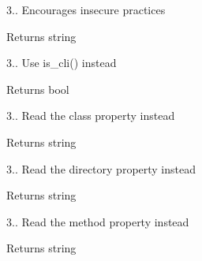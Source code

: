 
\begin{DoxyRefList}
\item[\label{deprecated__deprecated000001}%
\hypertarget{deprecated__deprecated000001}{}%
Global \hyperlink{class_c_i___config_a71e857f8dd38c230f1ce11bacf177ba8}{C\+I\+\_\+\+Config\+:\+:system\+\_\+url} ()]3.. Encourages insecure practices \begin{DoxyReturn}{Returns}
string  
\end{DoxyReturn}

\item[\label{deprecated__deprecated000002}%
\hypertarget{deprecated__deprecated000002}{}%
Global \hyperlink{class_c_i___input_a70c1e8a081ef955c1a52164634d4f66e}{C\+I\+\_\+\+Input\+:\+:is\+\_\+cli\+\_\+request} ()]3.. Use is\+\_\+cli() instead \begin{DoxyReturn}{Returns}
bool  
\end{DoxyReturn}

\item[\label{deprecated__deprecated000003}%
\hypertarget{deprecated__deprecated000003}{}%
Global \hyperlink{class_c_i___router_af5586c3f514021e9e2588e102620d237}{C\+I\+\_\+\+Router\+:\+:fetch\+\_\+class} ()]3.. Read the \textquotesingle{}class\textquotesingle{} property instead \begin{DoxyReturn}{Returns}
string  
\end{DoxyReturn}

\item[\label{deprecated__deprecated000005}%
\hypertarget{deprecated__deprecated000005}{}%
Global \hyperlink{class_c_i___router_a7a089f2cfae731dcc9e59a71d20208ef}{C\+I\+\_\+\+Router\+:\+:fetch\+\_\+directory} ()]3.. Read the \textquotesingle{}directory\textquotesingle{} property instead \begin{DoxyReturn}{Returns}
string  
\end{DoxyReturn}

\item[\label{deprecated__deprecated000004}%
\hypertarget{deprecated__deprecated000004}{}%
Global \hyperlink{class_c_i___router_ad408b28e3a095e7435f21e95d93e7714}{C\+I\+\_\+\+Router\+:\+:fetch\+\_\+method} ()]3.. Read the \textquotesingle{}method\textquotesingle{} property instead \begin{DoxyReturn}{Returns}
string 
\end{DoxyReturn}

\end{DoxyRefList}